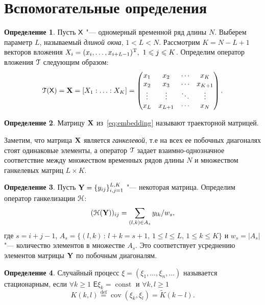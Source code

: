 \documentclass[specialist,
substylefile = spbu_report.rtx,
subf,href,colorlinks=true, 12pt]{disser}
\theoremstyle{definition}
\newtheorem{definition}{Определение}
\begin{document}
\section{Вспомогательные определения}\label{sect:definitions}
\begin{definition}
	Пусть $\mathsf{X}$ "--- одномерный временной ряд длины $N$. Выберем параметр $L$, называемый \emph{длиной окна}, $1<L<N$. Рассмотрим $K=N-L+1$ векторов вложения $X_i=(x_{i},\ldots, x_{i+L-1})^{\mathrm{T}},\ 1\leqslant j \leqslant K$. Определим оператор вложения $\EuScript{T}$ следующим образом:
	\begin{equation}\label{eq:embedding}
		\EuScript{T}(\mathsf{X})=\mathbf{X}=[X_1:\ldots:X_K]=
		\begin{pmatrix}
			x_1    & x_2     & \cdots & x_K     \\
			x_2    & x_3     & \cdots & x_{K+1} \\
			\vdots & \vdots  & \ddots & \vdots  \\
			x_L    & x_{L+1} & \cdots & x_N
		\end{pmatrix}.
	\end{equation}
\end{definition}
\begin{definition}
	Матрицу $\mathbf{X}$ из~\eqref{eq:embedding} называют траекторной матрицей.
\end{definition}\noindent
Заметим, что матрица $\mathbf{X}$ является \emph{ганкелевой}, т.е на всех ее побочных диагоналях стоят одинаковые элементы, а оператор $\EuScript{T}$ задает взаимно-однозначное соответствие между множеством временных рядов длины $N$ и множеством ганкелевых матриц $L\times K$.
\begin{definition}
	Пусть $\mathbf{Y}=\{y_{ij}\}_{i,j=1}^{L,K}$ "--- некоторая матрица. Определим оператор ганкелизации $\EuScript{H}$:
	\begin{equation}\label{eq:averaging}
		(\EuScript{H}(\mathbf{Y}))_{ij}=\sum_{(l,k)\in A_s}y_{lk}/w_s,
	\end{equation}
	где $s=i+j-1$, $A_s=\{(l,k)\, :\, l+k=s+1,\, 1\leqslant l\leqslant L,\, 1\leqslant k\leqslant K\}$ и $w_s=|A_s|$ "--- количество элементов в множестве $A_s$. Это соответствует
	усреднению элементов матрицы $\mathbf{Y}$ по побочным диагоналям.
\end{definition}
\begin{definition}
	Случайный процесс $\xi=(\xi_1,\ldots, \xi_n,\ldots)$ называется стационарным, если $\forall k\geqslant1$ $\mathsf E\xi_k=\operatorname{const}$ и $\forall k,l\geqslant1$
	\[
	K(k, l)\overset{\text{def}}=\operatorname{cov}(\xi_k, \xi_l)= \widetilde{K}(k-l).
	\]
\end{definition}
\end{document}
